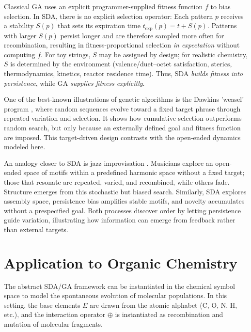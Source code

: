 \documentclass[life,article,submit,pdftex,moreauthors]{Definitions/mdpi}
\begin{document}
Classical GA uses an explicit programmer-supplied fitness function $f$ to bias selection. 
In SDA, there is no explicit selection operator: Each pattern $p$ receives a stability
$S(p)$ that sets its expiration time $t_{\exp}(p)=t+S(p)$. Patterns with larger $S(p)$ 
persist longer and are therefore sampled more often for recombination, resulting in fitness-proportional selection \emph{in expectation} without computing $f$. 
For toy strings, $S$ may be assigned by design; for realistic chemistry, $S$ is determined 
by the environment (valence/duet–octet satisfaction, sterics, thermodynamics, kinetics, 
reactor residence time). Thus, SDA \emph{builds fitness into persistence}, while GA
\emph{supplies fitness explicitly}.

One of the best-known illustrations of genetic algorithms is the Dawkins 'weasel' program \cite{dawkins1986blind}, where random sequences evolve
toward a fixed target phrase through repeated variation and selection. 
It shows how cumulative selection outperforms random search, but only
because an externally defined goal and fitness function are imposed. 
This target-driven design contrasts with the open-ended dynamics modeled
here.  

An analogy closer to SDA is jazz improvisation \cite{adler2025jazz}. 
Musicians explore an open-ended space of motifs within a predefined harmonic space
without a fixed target; 
those that resonate are repeated, varied, and recombined, while others
fade. Structure emerges from this stochastic but biased search. 
Similarly, SDA explores assembly space, persistence bias amplifies
stable motifs, and novelty accumulates without a prespecified goal. 
Both processes discover order by letting persistence guide variation, 
illustrating how information can emerge from feedback rather than
external targets.


\section{Application to Organic Chemistry}

The abstract SDA/GA framework can be instantiated in the chemical symbol space to model
the spontaneous evolution of molecular populations. In this setting, the base elements
$E$ are drawn from the atomic alphabet (C, O, N, H, etc.), and the interaction operator
$\oplus$ is instantiated as recombination and mutation of molecular fragments. 
\end{document}
